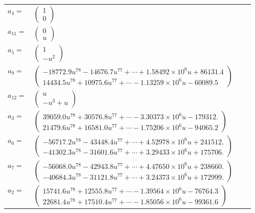 \documentclass[1p]{elsarticle_modified}
\theoremstyle{definition}
\begin{document}
\begin{tabular}{m{7pt} m{180pt} m{7pt} m{180pt} }
\flushright $a_{4}=$&$\begin{pmatrix}1\\0\end{pmatrix}$ \\
\flushright $a_{11}=$&$\begin{pmatrix}0\\u\end{pmatrix}$ \\
\flushright $a_{5}=$&$\begin{pmatrix}1\\- u^2\end{pmatrix}$ \\
\flushright $a_{9}=$&$\begin{pmatrix}-18772.9 u^{78}-14676.7 u^{77}+\cdots+1.58492\times10^{6} u+86131.4\\14434.5 u^{78}+10975.6 u^{77}+\cdots-1.13259\times10^{6} u-60089.5\end{pmatrix}$ \\
\flushright $a_{12}=$&$\begin{pmatrix}u\\- u^3+u\end{pmatrix}$ \\
\flushright $a_{3}=$&$\begin{pmatrix}39059.0 u^{78}+30576.8 u^{77}+\cdots-3.30373\times10^{6} u-179312.\\21479.6 u^{78}+16581.0 u^{77}+\cdots-1.75206\times10^{6} u-94065.2\end{pmatrix}$ \\
\flushright $a_{6}=$&$\begin{pmatrix}-56717.2 u^{78}-43448.4 u^{77}+\cdots+4.52978\times10^{6} u+241512.\\-41302.3 u^{78}-31601.6 u^{77}+\cdots+3.29433\times10^{6} u+175706.\end{pmatrix}$ \\
\flushright $a_{7}=$&$\begin{pmatrix}-56068.0 u^{78}-42943.8 u^{77}+\cdots+4.47650\times10^{6} u+238660.\\-40684.3 u^{78}-31121.8 u^{77}+\cdots+3.24373\times10^{6} u+172999.\end{pmatrix}$ \\
\flushright $a_{2}=$&$\begin{pmatrix}15741.6 u^{78}+12555.8 u^{77}+\cdots-1.39564\times10^{6} u-76764.3\\22681.4 u^{78}+17510.4 u^{77}+\cdots-1.85056\times10^{6} u-99361.6\end{pmatrix}$ \\

\end{tabular}
\end{document}

